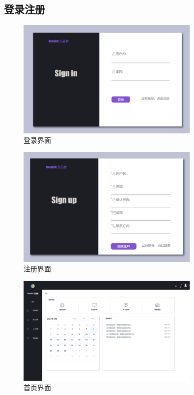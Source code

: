 \documentclass[UTF8]{ctexart}
\begin{document}
\subsection{登录注册}
\begin{figure}[H]
	\centering
	\includegraphics[width=0.8\textwidth]{0.png}
	\caption{登录界面}
\end{figure}
\begin{figure}[H]
	\centering
	\includegraphics[width=0.8\textwidth]{1.png}
	\caption{注册界面}
\end{figure}
\begin{figure}[H]
	\centering
	\includegraphics[width=0.8\textwidth]{3.png}
	\caption{首页界面}
\end{figure}
\end{document}
